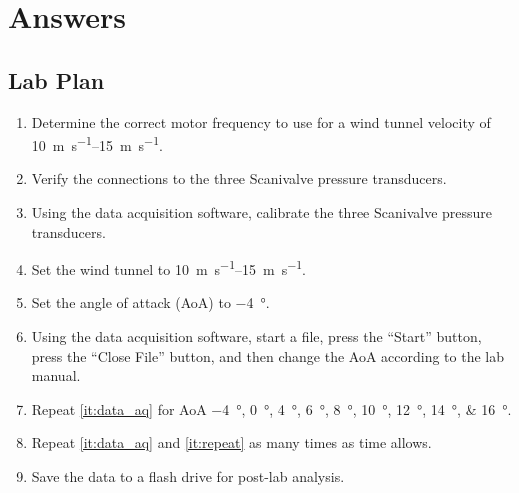 \chapter{Answers}
\label{cp:answers}
\section{Lab Plan}
\begin{enumerate}
    \item Determine the correct motor frequency to use for a wind tunnel velocity of \qtyrange{10}{15}{\meter\per\second}.
    \item Verify the connections to the three Scanivalve pressure transducers.
    \item Using the data acquisition software, calibrate the three Scanivalve pressure transducers.
    \item Set the wind tunnel to \qtyrange{10}{15}{\meter\per\second}.
    \item Set the angle of attack (AoA) to \qty{-4}{\degree}.
    \item Using the data acquisition software, start a file, press the ``Start'' button, press the ``Close File'' button, and then change the AoA according to the lab manual. \label{it:data_aq}
    \item Repeat \autoref{it:data_aq} for AoA \qtylist{-4;0;4;6;8;10;12;14;16}{\degree}. \label{it:repeat}
    \item Repeat \autoref{it:data_aq} and \autoref{it:repeat} as many times as time allows.
    \item Save the data to a flash drive for post-lab analysis.
\end{enumerate}
